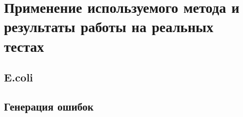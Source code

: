 \chapter{Применение используемого метода и результаты работы на реальных тестах}

\section{E.coli}
\section{Генерация ошибок}
 
